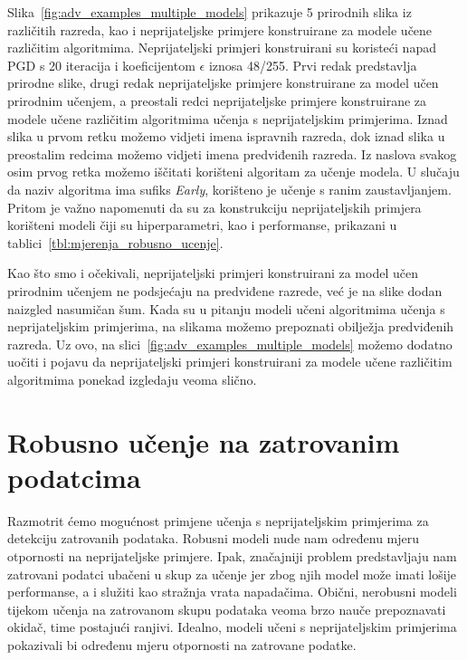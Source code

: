 \documentclass[times, utf8, zavrsni, numeric]{fer}
\begin{document}
Slika~\ref{fig:adv_examples_multiple_models} prikazuje 5 prirodnih slika iz različitih razreda, kao i neprijateljske primjere konstruirane za modele učene različitim algoritmima.
Neprijateljski primjeri konstruirani su koristeći napad PGD s 20 iteracija i koeficijentom $\epsilon$ iznosa 48/255. 
Prvi redak predstavlja prirodne slike, drugi redak neprijateljske primjere konstruirane za model učen prirodnim učenjem, a preostali redci neprijateljske primjere konstruirane za modele učene različitim algoritmima učenja s neprijateljskim primjerima.
Iznad slika u prvom retku možemo vidjeti imena ispravnih razreda, dok iznad slika u preostalim redcima možemo vidjeti imena predviđenih razreda.
Iz naslova svakog osim prvog retka možemo iščitati korišteni algoritam za učenje modela. U slučaju da naziv algoritma ima sufiks \textit{Early}, korišteno je učenje s ranim zaustavljanjem.
Pritom je važno napomenuti da su za konstrukciju neprijateljskih primjera korišteni modeli čiji su hiperparametri, kao i performanse, prikazani u tablici~\ref{tbl:mjerenja_robusno_ucenje}.

Kao što smo i očekivali, neprijateljski primjeri konstruirani za model učen prirodnim učenjem ne podsjećaju na predviđene razrede, već je na slike dodan naizgled nasumičan šum.
Kada su u pitanju modeli učeni algoritmima učenja s neprijateljskim primjerima, na slikama možemo prepoznati obilježja predviđenih razreda.
Uz ovo, na slici~\ref{fig:adv_examples_multiple_models} možemo dodatno uočiti i pojavu da neprijateljski primjeri konstruirani za modele učene različitim algoritmima ponekad izgledaju veoma slično.

\pagebreak

\section{Robusno učenje na zatrovanim podatcima}

Razmotrit ćemo mogućnost primjene učenja s neprijateljskim primjerima za detekciju zatrovanih podataka.
Robusni modeli nude nam određenu mjeru otpornosti na neprijateljske primjere. 
Ipak, značajniji problem predstavljaju nam zatrovani podatci ubačeni u skup za učenje jer zbog njih model može imati lošije performanse, a i služiti kao stražnja vrata napadačima.
Obični, nerobusni modeli tijekom učenja na zatrovanom skupu podataka veoma brzo nauče prepoznavati okidač, time postajući ranjivi.
Idealno, modeli učeni s neprijateljskim primjerima pokazivali bi određenu mjeru otpornosti na zatrovane podatke.
\end{document}
